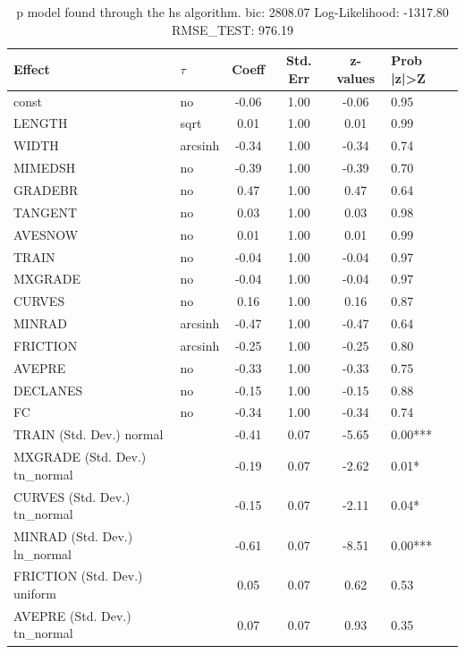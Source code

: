 \begin{table}
	\caption{p model found through the hs algorithm. bic: 2808.07 Log-Likelihood: -1317.80 RMSE_TEST: 976.19}
	\begin{center}
		\begin{tabular}{|l|l|c|c|c|l|}
			\hline
			Effect & $\tau$ & Coeff & Std. Err & z-values & Prob |z|>Z \\
			\hline
			const & no & -0.06 & 1.00 & -0.06 & 0.95 \\
			\hline
			LENGTH & sqrt & 0.01 & 1.00 & 0.01 & 0.99 \\
			\hline
			WIDTH & arcsinh & -0.34 & 1.00 & -0.34 & 0.74 \\
			\hline
			MIMEDSH & no & -0.39 & 1.00 & -0.39 & 0.70 \\
			\hline
			GRADEBR & no & 0.47 & 1.00 & 0.47 & 0.64 \\
			\hline
			TANGENT & no & 0.03 & 1.00 & 0.03 & 0.98 \\
			\hline
			AVESNOW & no & 0.01 & 1.00 & 0.01 & 0.99 \\
			\hline
			TRAIN & no & -0.04 & 1.00 & -0.04 & 0.97 \\
			\hline
			MXGRADE & no & -0.04 & 1.00 & -0.04 & 0.97 \\
			\hline
			CURVES & no & 0.16 & 1.00 & 0.16 & 0.87 \\
			\hline
			MINRAD & arcsinh & -0.47 & 1.00 & -0.47 & 0.64 \\
			\hline
			FRICTION & arcsinh & -0.25 & 1.00 & -0.25 & 0.80 \\
			\hline
			AVEPRE & no & -0.33 & 1.00 & -0.33 & 0.75 \\
			\hline
			DECLANES & no & -0.15 & 1.00 & -0.15 & 0.88 \\
			\hline
			FC & no & -0.34 & 1.00 & -0.34 & 0.74 \\
			\hline
			TRAIN (Std. Dev.) normal &  & -0.41 & 0.07 & -5.65 & 0.00*** \\
			\hline
			MXGRADE (Std. Dev.) tn_normal &  & -0.19 & 0.07 & -2.62 & 0.01* \\
			\hline
			CURVES (Std. Dev.) tn_normal &  & -0.15 & 0.07 & -2.11 & 0.04* \\
			\hline
			MINRAD (Std. Dev.) ln_normal &  & -0.61 & 0.07 & -8.51 & 0.00*** \\
			\hline
			FRICTION (Std. Dev.) uniform &  & 0.05 & 0.07 & 0.62 & 0.53 \\
			\hline
			AVEPRE (Std. Dev.) tn_normal &  & 0.07 & 0.07 & 0.93 & 0.35 \\
			\hline

\end{tabular}
\end{center}
\end{table}
